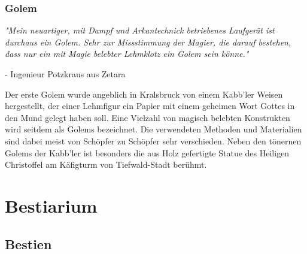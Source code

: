 \documentclass[12pt,twoside,twocolumn,openany]{book}
\begin{document}
\subsection{Golem}
\begin{quotebox}
	\textit{"Mein neuartiger, mit Dampf und Arkantechnick betriebenes Laufgerät ist durchaus ein Golem. Sehr zur Missstimmung der Magier, die darauf bestehen, dass nur ein mit Magie belebter Lehmklotz ein Golem sein könne."}
	\begin{flushright}
		- Ingenieur Potzkraus aus Zetara
	\end{flushright}
\end{quotebox}
Der erste Golem wurde angeblich in Kralsbruck von einem Kabb'ler Weisen hergestellt, der einer Lehmfigur ein Papier mit einem geheimen Wort Gottes in den Mund gelegt haben soll. Eine Vielzahl von magisch belebten Konstrukten wird seitdem als Golems bezeichnet. Die verwendeten Methoden und Materialien sind dabei meist von Schöpfer zu Schöpfer sehr verschieden. Neben den tönernen Golems der Kabb'ler ist besonders die aus Holz gefertigte Statue des Heiligen Christoffel am Käfigturm von Tiefwald-Stadt berühmt.








\chapter{Bestiarium}



\section{Bestien}
\end{document}
